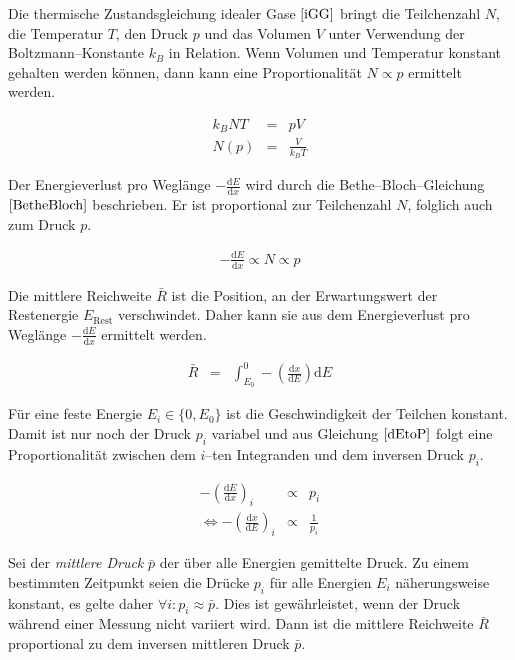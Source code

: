 \documentclass[12pt,a4paper]{scrartcl}
\numberwithin{equation}{section} %
\begin{document}
Die thermische Zustandsgleichung idealer Gase $\eqref{iGG}$ bringt die Teilchenzahl $N$, die Temperatur $T$, den Druck $p$ und das Volumen $V$ unter Verwendung der Boltzmann--Konstante $k_B$ in Relation. Wenn Volumen und Temperatur konstant gehalten werden können, dann kann eine Proportionalität $N\propto p$ ermittelt werden.

\begin{eqnarray}
    k_B N T &=& pV \label{iGG} \\
    N(p) &=& \frac{V}{k_B T}
\end{eqnarray}

\noindent
Der Energieverlust pro Weglänge $-\frac{\mathrm dE}{\mathrm dx}$ wird durch die Bethe--Bloch--Gleichung $\eqref{BetheBloch}$ beschrieben. Er ist proportional zur Teilchenzahl $N$, folglich auch zum Druck $p$.

\begin{eqnarray}
    -\frac{\mathrm dE}{\mathrm dx}\propto N\propto p \label{dEtoP}
\end{eqnarray}

\noindent
Die mittlere Reichweite $\bar R$ ist die Position, an der Erwartungswert der Restenergie $E_\mathrm{Rest}$ verschwindet. Daher kann sie aus dem Energieverlust pro Weglänge $-\frac{\mathrm dE}{\mathrm dx}$ ermittelt werden.

\begin{eqnarray}
    \bar{R} &=&
        \int_{E_0}^{0} -\left(\frac{\mathrm dx}{\mathrm dE}\right) \mathrm dE
\end{eqnarray}

\noindent
Für eine feste Energie $E_i \in \{0, E_0\}$ ist die Geschwindigkeit der Teilchen konstant. Damit ist nur noch der Druck $p_i$ variabel und aus Gleichung $\eqref{dEtoP}$ folgt eine Proportionalität zwischen dem $i$--ten Integranden und dem inversen Druck $p_i$.

\begin{eqnarray}
    -\left(\frac{\mathrm dE}{\mathrm dx}\right)_i &\propto& p_i \\
    \Leftrightarrow -\left(\frac{\mathrm dx}{\mathrm dE}\right)_i
        &\propto& \frac{1}{p_i}
\end{eqnarray}

\noindent
Sei der \emph{mittlere Druck} $\bar p$ der über alle Energien gemittelte Druck. Zu einem bestimmten Zeitpunkt seien die Drücke $p_i$ für alle Energien $E_i$ näherungsweise konstant, es gelte daher $\forall i: p_i \approx \bar p$. Dies ist gewährleistet, wenn der Druck während einer Messung nicht variiert wird. Dann ist die mittlere Reichweite $\bar R$ proportional zu dem inversen mittleren Druck $\bar p$.
\end{document}
